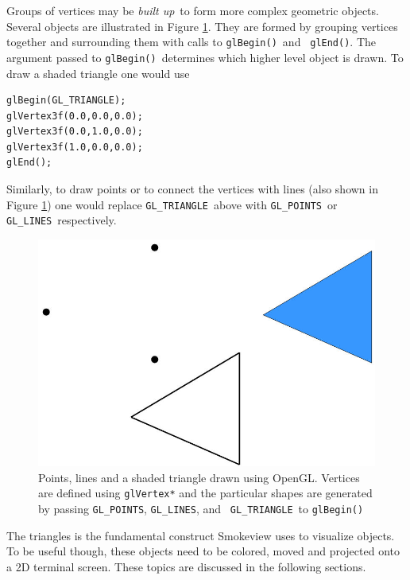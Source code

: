 \documentclass[11pt,twoside]{book}
\newcommand{\figoptions}{htp}
\begin{document}
Groups of vertices may be {\em built up}\ to form more complex geometric objects.
Several objects are illustrated in Figure \ref{figshapes}.  They are formed by grouping vertices together
and surrounding them with calls to {\tt glBegin()}\ and {\tt
glEnd()}. The argument passed to {\tt glBegin()}\ determines which higher level object is drawn.
To draw a shaded triangle one would use
\begin{verbatim}
glBegin(GL_TRIANGLE);
glVertex3f(0.0,0.0,0.0);
glVertex3f(0.0,1.0,0.0);
glVertex3f(1.0,0.0,0.0);
glEnd();
\end{verbatim}
Similarly, to draw points or to connect the vertices with lines (also shown
in Figure \ref{figshapes}) one would replace {\tt GL\_TRIANGLE}\ above
with {\tt GL\_POINTS}\ or {\tt GL\_LINES}\ respectively.
\begin{figure}[\figoptions]
\begin{center}
\includegraphics[width=6.0in]{figures/shapes}
\end{center}
\caption[Points, lines and a shaded triangle drawn using OpenGL.]
{Points, lines and a shaded triangle drawn using OpenGL. Vertices
are defined using {\tt glVertex*} and the particular shapes are
generated by passing {\tt GL\_POINTS}, {\tt GL\_LINES}, and {\tt
GL\_TRIANGLE}\ to {\tt glBegin()} } \label{figshapes}
\end{figure}

The triangles is the fundamental construct Smokeview uses to
visualize objects.  To be useful though, these objects need to be
colored, moved and projected onto a 2D terminal screen. These
topics are discussed in the following sections.

%
%
\end{document}
